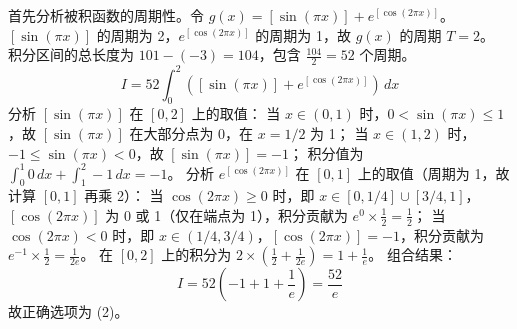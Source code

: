 \begin{questions}
\begin{solution}
首先分析被积函数的周期性。令 $g(x) = [\sin(\pi x)] + e^{[\cos(2\pi x)]}$。
$[\sin(\pi x)]$ 的周期为 2，$e^{[\cos(2\pi x)]}$ 的周期为 1，故 $g(x)$ 的周期 $T = 2$。
积分区间的总长度为 $101 - (-3) = 104$，包含 $\frac{104}{2} = 52$ 个周期。
\[
I = 52 \int_{0}^{2} ([\sin(\pi x)] + e^{[\cos(2\pi x)]}) \, dx
\]
分析 $[\sin(\pi x)]$ 在 $[0, 2]$ 上的取值：
当 $x \in (0, 1)$ 时，$0 < \sin(\pi x) \le 1$，故 $[\sin(\pi x)]$ 在大部分点为 0，在 $x=1/2$ 为 1；
当 $x \in (1, 2)$ 时，$-1 \le \sin(\pi x) < 0$，故 $[\sin(\pi x)] = -1$；
积分值为 $\int_{0}^{1} 0 \, dx + \int_{1}^{2} -1 \, dx = -1$。
分析 $e^{[\cos(2\pi x)]}$ 在 $[0, 1]$ 上的取值（周期为 1，故计算 $[0,1]$ 再乘 2）：
当 $\cos(2\pi x) \ge 0$ 时，即 $x \in [0, 1/4] \cup [3/4, 1]$，$[\cos(2\pi x)]$ 为 0 或 1（仅在端点为 1），积分贡献为 $e^0 \times \frac{1}{2} = \frac{1}{2}$；
当 $\cos(2\pi x) < 0$ 时，即 $x \in (1/4, 3/4)$，$[\cos(2\pi x)] = -1$，积分贡献为 $e^{-1} \times \frac{1}{2} = \frac{1}{2e}$。
在 $[0,2]$ 上的积分为 $2 \times (\frac{1}{2} + \frac{1}{2e}) = 1 + \frac{1}{e}$。
组合结果：
\[
I = 52 \left( -1 + 1 + \frac{1}{e} \right) = \frac{52}{e}
\]
故正确选项为 (2)。
\end{solution}
    \question 
\end{questions}
